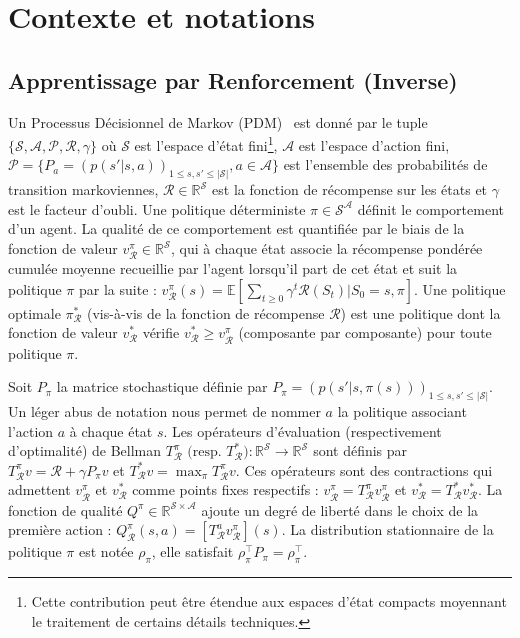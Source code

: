 \documentclass[french,utf8]{./hermes-journal}
\newcommand{\p}{\mathcal{P}}
\newcommand{\R}{\mathcal{R}}
\newcommand{\s}{\mathcal{S}}
\newcommand{\A}{\mathcal{A}}
\newcommand{\E}{\mathbb{E}}
\begin{document}
\section{Contexte et notations}
\label{seackground}

\subsection{Apprentissage par Renforcement (Inverse)}
\label{subseackgrounrl}

Un Processus Décisionnel de Markov (PDM)~\cite{Puterma994} est donné par le tuple $\{\s,\A,\p,\R,\gamma\}$ où $\s$ est l'espace d'état fini\footnote{Cette contribution peut être étendue aux espaces d'état compacts moyennant le traitement de certains détails techniques.}, $\A$ est l'espace d'action fini, $\p =
\{P_a = (p(s'|s,a))_{1\leq s,s'\leq |\s|}, a\in\A\}$ est l'ensemble des probabilités de transition markoviennes, $\R\in\mathbb{R}^\s$ est la fonction de récompense sur les états et $\gamma$ est le facteur d'oubli.
Une politique déterministe $\pi\in\s^\A$ définit le comportement d'un agent. La qualité de ce comportement est quantifiée par le biais de la fonction de valeur $v_\R^\pi\in\mathbb{R}^\s$, qui à chaque état associe la récompense pondérée cumulée moyenne recueillie par l'agent lorsqu'il part de cet état et suit la politique $\pi$ par la suite : $v_\R^\pi(s) = \E[\sum_{t\geq 0} \gamma^t \R(S_t)|S_0=s,\pi]$. Une politique optimale $\pi_\R^*$ (vis-à-vis de la fonction de récompense $\R$) est une politique dont la fonction de valeur $v^*_\R$ vérifie $v_\R^* \geq v_\R^\pi$ (composante par composante) pour toute politique $\pi$.

Soit $P_\pi$ la matrice stochastique définie par $P_\pi =
(p(s'|s,\pi(s)))_{1\leq s,s'\leq |\s|}$. Un léger abus de notation nous permet de nommer $a$ la politique associant l'action $a$ à chaque état $s$. Les opérateurs d'évaluation (respectivement d'optimalité) de Bellman $T^\pi_\R\text{ (resp. $T^*_\R$)}:\mathbb{R}^\s
\rightarrow \mathbb{R}^\s$ sont définis par $T^\pi_\R v = \R + \gamma
P_\pi v$ et $T_\R^*v = \max_\pi T_\R^\pi v$.
Ces opérateurs sont des contractions qui admettent $v_\R^\pi$ et $v^*_\R$ comme points fixes respectifs : $v_\R^\pi = T^\pi_\R v_\R^\pi$ et $v^*_\R = T^*_\R v^*_\R$.
La fonction de qualité $Q^\pi\in\mathbb{R}^{\s\times \A}$ ajoute un degré de liberté dans le choix de la première action : $Q_\R^\pi(s,a)
= [T^a_\R v^\pi_\R](s)$. La distribution stationnaire de la politique $\pi$ est notée $\rho_\pi$, elle satisfait $\rho_\pi^\top P_\pi = \rho_\pi^\top$.
\end{document}
